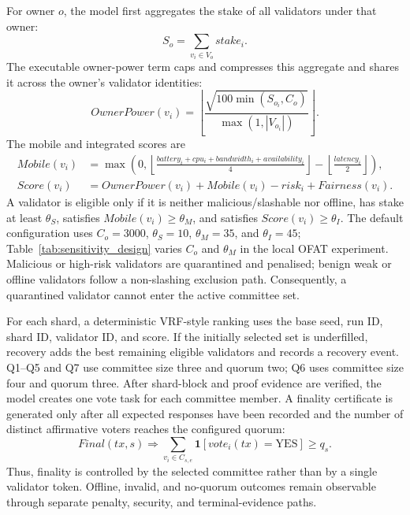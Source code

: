 \documentclass[a4paper,fleqn]{cas-sc}
\begin{document}
For owner \(o\), the model first aggregates the stake of all validators under
that owner:
\begin{equation}
S_o=\sum_{v_i\in V_o} stake_i.
\label{eq:owner_stake}
\end{equation}
The executable owner-power term caps and compresses this aggregate and shares it
across the owner's validator identities:
\begin{equation}
OwnerPower(v_i)=
\left\lfloor
\frac{\sqrt{100\min(S_{o_i},C_o)}}{\max(1,|V_{o_i}|)}
\right\rfloor .
\label{eq:owner_power}
\end{equation}
The mobile and integrated scores are
\begin{align}
Mobile(v_i)&=\max\left(0,
\left\lfloor\frac{battery_i+cpu_i+bandwidth_i+availability_i}{4}\right\rfloor
-\left\lfloor\frac{latency_i}{2}\right\rfloor\right),
\label{eq:mobile_score}\\
Score(v_i)&=OwnerPower(v_i)+Mobile(v_i)-risk_i+Fairness(v_i).
\label{eq:integrated_score}
\end{align}
A validator is eligible only if it is neither malicious/slashable nor offline,
has stake at least \(\theta_S\), satisfies \(Mobile(v_i)\geq\theta_M\), and
satisfies \(Score(v_i)\geq\theta_I\). The default configuration uses
\(C_o=3000\), \(\theta_S=10\), \(\theta_M=35\), and \(\theta_I=45\);
Table~\ref{tab:sensitivity_design} varies \(C_o\) and \(\theta_M\) in the local
OFAT experiment. Malicious or high-risk validators are quarantined and
penalised; benign weak or
offline validators follow a non-slashing exclusion path. Consequently, a
quarantined validator cannot enter the active committee set.

For each shard, a deterministic VRF-style ranking uses the base seed, run ID,
shard ID, validator ID, and score. If the initially selected set is underfilled,
recovery adds the best remaining eligible validators and records a recovery
event. Q1--Q5 and Q7 use committee size three and quorum two; Q6 uses committee
size four and quorum three. After shard-block and proof evidence are verified,
the model creates one vote task for each committee member. A finality
certificate is generated only after all expected responses have been recorded
and the number of distinct affirmative voters reaches the configured quorum:
\begin{equation}
Final(tx,s)\Rightarrow
\sum_{v_i\in C_{s,e}}\mathbf{1}[vote_i(tx)=\mathrm{YES}]\geq q_s.
\label{eq:quorum_finality}
\end{equation}
Thus, finality is controlled by the selected committee rather than by a single
validator token. Offline, invalid, and no-quorum outcomes remain observable
through separate penalty, security, and terminal-evidence paths.
\end{document}
